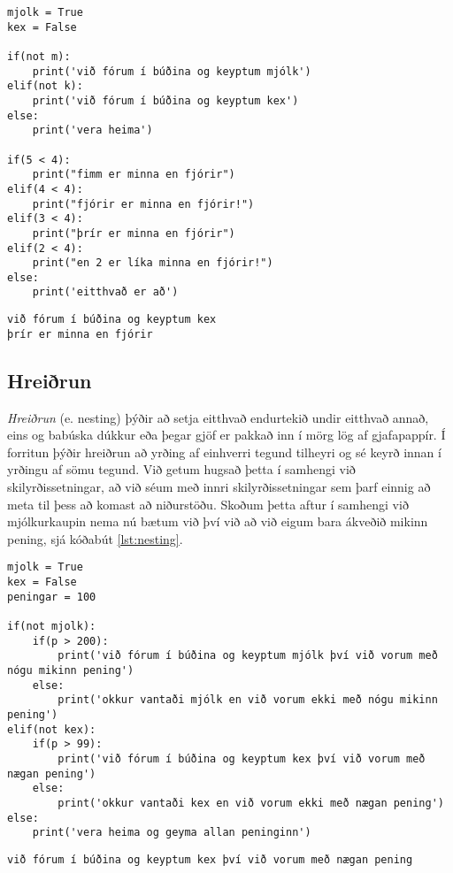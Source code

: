 \begin{lstlisting}[caption=elif notað, label=lst:elif]
mjolk = True 
kex = False 

if(not m):
	print('við fórum í búðina og keyptum mjólk')
elif(not k):
	print('við fórum í búðina og keyptum kex')
else:
	print('vera heima')

if(5 < 4):
	print("fimm er minna en fjórir")
elif(4 < 4):
	print("fjórir er minna en fjórir!")
elif(3 < 4):
	print("þrír er minna en fjórir")
elif(2 < 4):
	print("en 2 er líka minna en fjórir!")
else:
	print('eitthvað er að')
\end{lstlisting}
\lstset{style=uttak}
\begin{lstlisting}
við fórum í búðina og keyptum kex
þrír er minna en fjórir
\end{lstlisting}
\lstset{style=venjulegt}


\subsection{Hreiðrun}\label{uk:hreiðrun}
\emph{Hreiðrun} (e. nesting) þýðir að setja eitthvað endurtekið undir eitthvað annað, eins og babúska dúkkur eða þegar gjöf er pakkað inn í mörg lög af gjafapappír.
Í forritun þýðir hreiðrun að yrðing af einhverri tegund tilheyri og sé keyrð innan í yrðingu af sömu tegund.
Við getum hugsað þetta í samhengi við skilyrðissetningar, að við séum með innri skilyrðissetningar sem þarf einnig að meta til þess að komast að niðurstöðu.
Skoðum þetta aftur í samhengi við mjólkurkaupin nema nú bætum við því við að við eigum bara ákveðið mikinn pening, sjá kóðabút \ref{lst:nesting}.

\begin{lstlisting}[caption=Hreiðrun, label=lst:nesting]
mjolk = True 
kex = False 
peningar = 100 

if(not mjolk):
	if(p > 200):
		print('við fórum í búðina og keyptum mjólk því við vorum með nógu mikinn pening')
	else:
		print('okkur vantaði mjólk en við vorum ekki með nógu mikinn pening')
elif(not kex):
	if(p > 99):
		print('við fórum í búðina og keyptum kex því við vorum með nægan pening')
	else:
		print('okkur vantaði kex en við vorum ekki með nægan pening')
else:
	print('vera heima og geyma allan peninginn')
\end{lstlisting}
\lstset{style=uttak}
\begin{lstlisting}
við fórum í búðina og keyptum kex því við vorum með nægan pening
\end{lstlisting}
\lstset{style=venjulegt}

